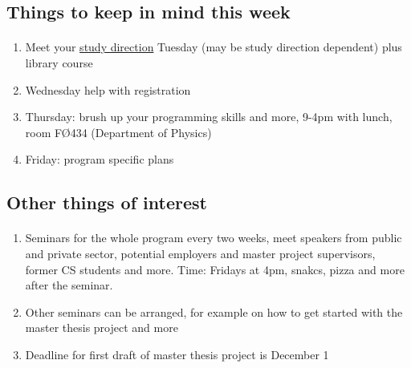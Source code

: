\documentclass[%
oneside,                 %
final,                   %
10pt]{article}
\begin{document}
\noindent



\subsection*{Things to keep in mind this week}

\paragraph{}
\begin{enumerate}
\item Meet your \href{{https://www.mn.uio.no/fysikk/english/studies/master/welcomeweek/index.html}}{study direction} Tuesday (may be study direction dependent) plus library course

\item Wednesday help with registration

\item Thursday: brush up your programming skills and more, 9-4pm with lunch, room FØ434 (Department of Physics)

\item Friday: program specific plans
\end{enumerate}

\noindent



\subsection*{Other things of interest}


\paragraph{}
\begin{enumerate}
\item Seminars for the whole program every two weeks, meet speakers from public and private sector, potential employers and master project supervisors, former CS students and more. Time: Fridays at 4pm, snakcs, pizza and more after the seminar.

\item Other seminars can be arranged, for example on how to get started with the master thesis project and more

\item Deadline for first draft of master thesis project is December 1
\end{enumerate}
\end{document}
